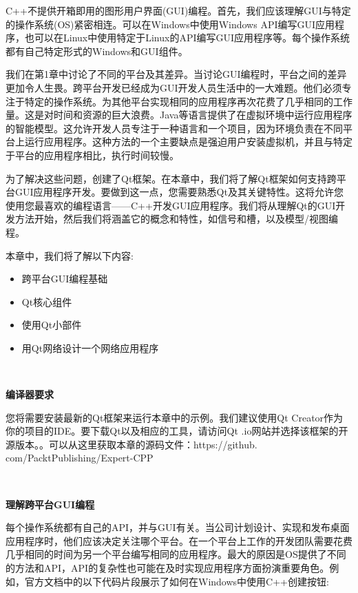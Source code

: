 C++不提供开箱即用的图形用户界面(GUI)编程。首先，我们应该理解GUI与特定的操作系统(OS)紧密相连。可以在Windows中使用Windows API编写GUI应用程序，也可以在Linux中使用特定于Linux的API编写GUI应用程序等。每个操作系统都有自己特定形式的Windows和GUI组件。 \par
我们在第1章中讨论了不同的平台及其差异。当讨论GUI编程时，平台之间的差异更加令人生畏。跨平台开发已经成为GUI开发人员生活中的一大难题。他们必须专注于特定的操作系统。为其他平台实现相同的应用程序再次花费了几乎相同的工作量。这是对时间和资源的巨大浪费。Java等语言提供了在虚拟环境中运行应用程序的智能模型。这允许开发人员专注于一种语言和一个项目，因为环境负责在不同平台上运行应用程序。这种方法的一个主要缺点是强迫用户安装虚拟机，并且与特定于平台的应用程序相比，执行时间较慢。 \par
为了解决这些问题，创建了Qt框架。在本章中，我们将了解Qt框架如何支持跨平台GUI应用程序开发。要做到这一点，您需要熟悉Qt及其关键特性。这将允许您使用您最喜欢的编程语言——C++开发GUI应用程序。我们将从理解Qt的GUI开发方法开始，然后我们将涵盖它的概念和特性，如信号和槽，以及模型/视图编程。 \par

本章中，我们将了解以下内容: \par

\begin{itemize}
	\item 跨平台GUI编程基础
	\item Qt核心组件
	\item 使用Qt小部件
	\item 用Qt网络设计一个网络应用程序
\end{itemize}

\noindent\textbf{}\ \par
\textbf{编译器要求} \ \par
您将需要安装最新的Qt框架来运行本章中的示例。我们建议使用Qt Creator作为你的项目的IDE。要下载Qt以及相应的工具，请访问Qt .io网站并选择该框架的开源版本。。可以从这里获取本章的源码文件：https:/​/github.​com/PacktPublishing/Expert-CPP \par

\noindent\textbf{}\ \par
\textbf{理解跨平台GUI编程} \ \par
每个操作系统都有自己的API，并与GUI有关。当公司计划设计、实现和发布桌面应用程序时，他们应该决定关注哪个平台。在一个平台上工作的开发团队需要花费几乎相同的时间为另一个平台编写相同的应用程序。最大的原因是OS提供了不同的方法和API，API的复杂性也可能在及时实现应用程序方面扮演重要角色。例如，官方文档中的以下代码片段展示了如何在Windows中使用C++创建按钮: \par

